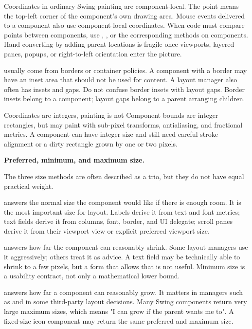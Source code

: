 Coordinates in ordinary Swing painting are component-local. The point  means the top-left corner of the component's own drawing area. Mouse events delivered to a component also use component-local coordinates. When code must compare points between components, use , , or the corresponding methods on components. Hand-converting by adding parent locations is fragile once viewports, layered panes, popups, or right-to-left orientation enter the picture.

 usually come from borders or container policies. A component with a border may have an inset area that should not be used for content. A layout manager also often has insets and gaps. Do not confuse border insets with layout gaps. Border insets belong to a component; layout gaps belong to a parent arranging children.

\begin{detailbox}{Coordinates are integers, painting is not}
Component bounds are integer rectangles, but  may paint with sub-pixel transforms, antialiasing, and fractional metrics. A component can have integer size and still need careful stroke alignment or a dirty rectangle grown by one or two pixels.
\end{detailbox}

\textbf{Preferred, minimum, and maximum size.}

The three size methods are often described as a trio, but they do not have equal practical weight.

 answers the normal size the component would like if there is enough room. It is the most important size for layout. Labels derive it from text and font metrics; text fields derive it from columns, font, border, and UI delegate; scroll panes derive it from their viewport view or explicit preferred viewport size.

 answers how far the component can reasonably shrink. Some layout managers use it aggressively; others treat it as advice. A text field may be technically able to shrink to a few pixels, but a form that allows that is not useful. Minimum size is a usability contract, not only a mathematical lower bound.

 answers how far a component can reasonably grow. It matters in managers such as  and in some third-party layout decisions. Many Swing components return very large maximum sizes, which means "I can grow if the parent wants me to". A fixed-size icon component may return the same preferred and maximum size.


